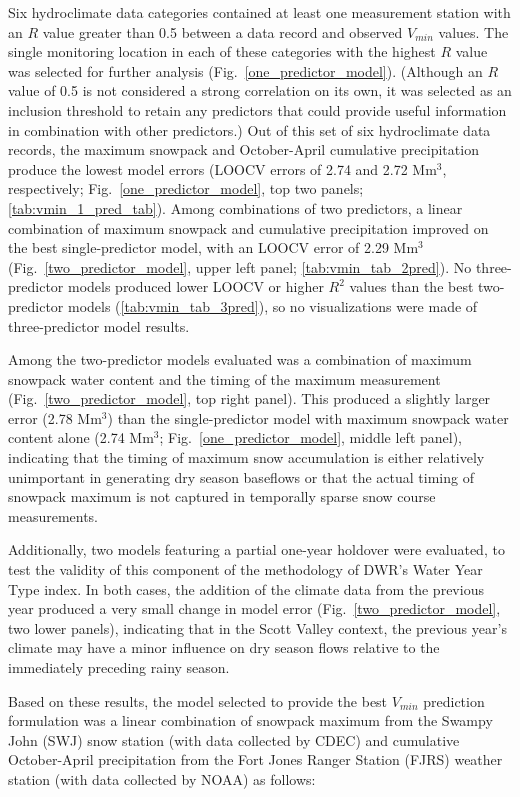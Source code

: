 \documentclass[hess, manuscript]{copernicus}
\begin{document}
Six hydroclimate data categories contained at least one measurement
station with an $R$ value greater than 0.5 between a data record and
observed $V_{min}$ values. The single monitoring location in each of
these categories with the highest $R$ value was selected for further
analysis (Fig.~\ref{one_predictor_model}). (Although an $R$ value
of 0.5 is not considered a strong correlation on its own, it was
selected as an inclusion threshold to retain any predictors that could
provide useful information in combination with other predictors.) Out of
this set of six hydroclimate data records, the maximum snowpack and
October-April cumulative precipitation produce the lowest model errors
(LOOCV errors of 2.74 and 2.72 Mm$^\mathrm{3}$, respectively;
Fig.~\ref{one_predictor_model}, top two panels;
\autoref{tab:vmin_1_pred_tab}). Among combinations of two predictors, a
linear combination of maximum snowpack and cumulative precipitation
improved on the best single-predictor model, with an LOOCV error of 2.29
Mm$^\mathrm{3}$ (Fig.~\ref{two_predictor_model}, upper left
panel; \autoref{tab:vmin_tab_2pred}). No three-predictor models produced
lower LOOCV or higher $R^2$ values than the best two-predictor models
(\autoref{tab:vmin_tab_3pred}), so no visualizations were made of
three-predictor model results.

Among the two-predictor models evaluated was a combination of maximum
snowpack water content and the timing of the maximum measurement
(Fig.~\ref{two_predictor_model}, top right panel). This produced a
slightly larger error (2.78 Mm$^\mathrm{3}$) than the
single-predictor model with maximum snowpack water content alone (2.74
Mm$^\mathrm{3}$; Fig.~\ref{one_predictor_model}, middle left
panel), indicating that the timing of maximum snow accumulation is
either relatively unimportant in generating dry season baseflows or that
the actual timing of snowpack maximum is not captured in temporally
sparse snow course measurements.

Additionally, two models featuring a partial one-year holdover were
evaluated, to test the validity of this component of the methodology of
DWR's Water Year Type index. In both cases, the addition of the climate
data from the previous year produced a very small change in model error
(Fig.~\ref{two_predictor_model}, two lower panels), indicating that
in the Scott Valley context, the previous year's climate may have a
minor influence on dry season flows relative to the immediately
preceding rainy season.

Based on these results, the model selected to provide the best
$V_{min}$ prediction formulation was a linear combination of snowpack
maximum from the Swampy John (SWJ) snow station (with data collected by
CDEC) and cumulative October-April precipitation from the Fort Jones
Ranger Station (FJRS) weather station (with data collected by NOAA) as
follows:
\end{document}
